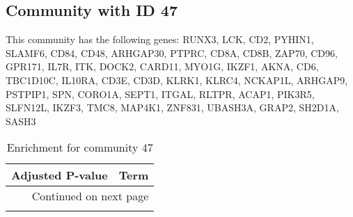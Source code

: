\subsection*{Community with ID 47}
This community has the following genes: RUNX3, LCK, CD2, PYHIN1, SLAMF6, CD84, CD48, ARHGAP30, PTPRC, CD8A, CD8B, ZAP70, CD96, GPR171, IL7R, ITK, DOCK2, CARD11, MYO1G, IKZF1, AKNA, CD6, TBC1D10C, IL10RA, CD3E, CD3D, KLRK1, KLRC4, NCKAP1L, ARHGAP9, PSTPIP1, SPN, CORO1A, SEPT1, ITGAL, RLTPR, ACAP1, PIK3R5, SLFN12L, IKZF3, TMC8, MAP4K1, ZNF831, UBASH3A, GRAP2, SH2D1A, SASH3
\\
\begin{longtable}{p{2.4cm}p{14.5cm}}
\caption{Enrichment for community 47}\\
\toprule
Adjusted \newline P-value &                                                                                                Term \\
\midrule
\endhead
\midrule
\multicolumn{2}{r}{{Continued on next page}} \\
\midrule
\endfoot


\end{longtable}
